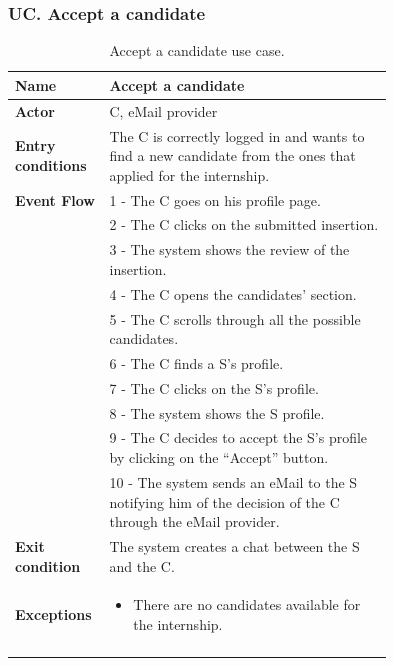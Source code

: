 \subsubsection*{UC\cuc . Accept a candidate}
\begin{center}
    \begin{longtable}{|l|p{0.75\linewidth}|}
        \hline
        \textbf{Name}               & Accept a candidate\\
        \hline
        \textbf{Actor}              & C, eMail provider\\
        \hline
        \textbf{Entry conditions}   & The C is correctly logged in and wants to find a new candidate from the ones that applied for the internship.\\
        \hline
        \textbf{Event Flow}         & 1 - The C goes on his profile page. \\
        & 2 - The C clicks on the submitted insertion. \\
        & 3 - The system shows the review of the insertion. \\
        & 4 - The C opens the candidates’ section. \\
        & 5 - The C scrolls through all the possible candidates. \\
        & 6 - The C finds a S’s profile. \\
        & 7 - The C clicks on the S’s profile. \\
        & 8 - The system shows the S profile. \\
        & 9 - The C decides to accept the S’s profile by clicking on the “Accept” button. \\
        & 10 - The system sends an eMail to the S notifying him of the decision of the C through the eMail provider. \\
        \hline
        \textbf{Exit condition}   & The system creates a chat between the S and the C. \\       
        \hline
        \textbf{Exceptions}       & \begin{itemize}
            \item There are no candidates available for the internship.
        \end{itemize}\\
        \hline
        \caption{Accept a candidate use case.}
        \label{tab: accept_a_candidate_use_case}
    \end{longtable}
\end{center}


